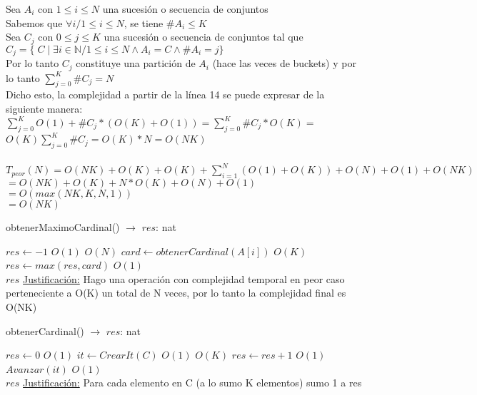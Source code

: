 \documentclass[10pt, a4paper]{article}
\begin{document}
Sea $A_i$ con $1 \leq i \leq N$ una sucesión o secuencia de conjuntos\\
Sabemos que $\forall i / 1 \leq i \leq N$, se tiene $\#A_i \leq K$\\
Sea $C_j$ con $0 \leq j \leq K$ una sucesión o secuencia de conjuntos tal que\\
$C_j = \{ \; C \; | \; \exists i \in \mathbb{N} / 1 \leq i \leq N \wedge A_i = C \wedge \#A_i = j \}$ \\
Por lo tanto $C_j$ constituye una partición de $A_i$ (hace las veces de buckets) y por lo tanto $\sum_{j=0}^{K}\#C_j = N$ \\
Dicho esto, la complejidad a partir de la línea 14 se puede expresar de la siguiente manera: \\
$\sum_{j=0}^{K} O(1) + \#C_j * (O(K) + O(1)) = \sum_{j=0}^{K}\#C_j * O(K) =$\\
$O(K)\sum_{j=0}^{K}\#C_j = O(K)*N = O(NK)$
\\\\
 
$T_{peor}(N) = O(NK) + O(K) + O(K) + \sum_{i=1}^{N}(O(1) + O(K)) + O(N) + O(1) + O(NK)$\\
$= O(NK) + O(K) + N*O(K) + O(N) + O(1)$ \\
$= O(max(NK, K, N, 1))$\\
$= O(NK)$\\

\begin{algorithm}[H]{obtenerMaximoCardinal() $\to$ $res$: nat}	
	\begin{algorithmic}[1]
			 \State $res \gets -1$			\Comment $O(1)$
			 			\Comment $O(N)$
			 	\State $card\gets obtenerCardinal(A[i])$			\Comment $O(K)$
			 	\State $res\gets max(res, card)$			\Comment $O(1)$
			 \EndFor \\
			\Return $res$
		\medskip
		\Statex \underline{Justificación:} Hago una operación con complejidad temporal en peor caso perteneciente a O(K) un total de N veces, por lo tanto la complejidad final es O(NK)
    \end{algorithmic}
\end{algorithm}	



\begin{algorithm}[H]{obtenerCardinal() $\to$ $res$: nat}	
	\begin{algorithmic}[1]
			\State $res \gets 0$			\Comment $O(1)$
    		\State $it \gets CrearIt(C)$	\Comment $O(1)$
    					\Comment $O(K)$
			 	\State $res\gets res+1$	\Comment $O(1)$
			 	\State $Avanzar(it)$	\Comment $O(1)$
			 \EndWhile \\
			\Return $res$
		\medskip
		\Statex \underline{Justificación:} Para cada elemento en C (a lo sumo K elementos) sumo 1 a res
    \end{algorithmic}
\end{algorithm}
\end{document}
